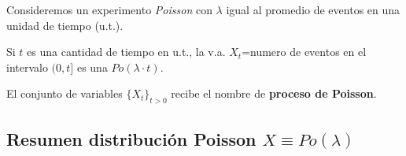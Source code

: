 \documentclass[]{book}
\begin{document}
Consideremos un experimento \emph{Poisson} con \(\lambda\) igual
al promedio de eventos en una unidad de tiempo (u.t.).

Si \(t\) es una cantidad de tiempo en u.t., la v.a. \(X_{t}\)=numero de eventos en el intervalo \((0,t]\) es una \(Po(\lambda\cdot t)\).

El conjunto de variables \(\{X_t\}_{t>0}\) recibe el nombre de \textbf{proceso de Poisson}.

\hypertarget{resumen-distribuciuxf3n-poisson-xequiv-polambda}{%
\subsection{\texorpdfstring{Resumen distribución Poisson \(X\equiv Po(\lambda)\)}{Resumen distribución Poisson X\textbackslash{}equiv Po(\textbackslash{}lambda)}}\label{resumen-distribuciuxf3n-poisson-xequiv-polambda}}
\end{document}

